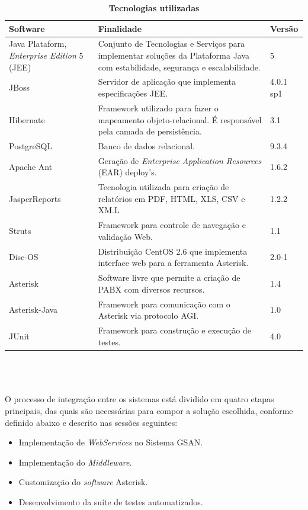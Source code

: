 \begin{table}[H]
	\footnotesize
	\caption{\textbf{Tecnologias utilizadas}}
	\label{tabela:tecnologiasUtilizadas}
	\begin{tabular}{|p{4cm}|p{7cm}|p{2cm}|}
		\hline
		\textbf{Software} & \textbf{Finalidade} & \textbf{Versão} \\
		\hline
		Java Plataform, \textit{Enterprise Edition} 5 (JEE) & Conjunto de Tecnologias e Serviços para implementar soluções da Plataforma Java com estabilidade, segurança e escalabilidade. & 5 \\
		\hline
		JBoss 				& Servidor de aplicação que implementa especificações JEE. 								& 4.0.1 sp1 \\
		\hline
		Hibernate 			& Framework utilizado para fazer o mapeamento objeto-relacional. É responsável pela camada de persistência. & 3.1 \\
		\hline
		PostgreSQL 			& Banco de dados relacional. 															& 9.3.4 \\
		\hline
		Apache Ant 			& Geração de \textit{Enterprise Application Resources} (EAR) deploy’s. 					& 1.6.2 \\
		\hline
		JasperReports 		& Tecnologia utilizada para criação de relatórios em PDF, HTML, XLS, CSV e XM.L 		& 1.2.2 \\
		\hline
		Struts 				& Framework para controle de navegação e validação Web. 								& 1.1	 \\
		\hline
		Disc-OS 			& Distribuição CentOS 2.6 que implementa interface web para a ferramenta Asterisk. 		& 2.0-1 \\
		\hline
		Asterisk 			& Software livre que permite a criação de PABX com diversos recursos. 					& 1.4 \\		
		\hline
		Asterisk-Java 		& Framework para comunicação com o Asterisk via protocolo AGI. 							& 1.0 \\
		\hline
		JUnit		 		& Framework para construção e execução de testes. 										& 4.0 \\		
		\hline			
	\end{tabular}\\[6pt]
	\fontsize{10}{12}\selectfont {Fonte: Autoria Própria.}
\end{table}



\section{\fontsize{12}{1} }
O processo de integração entre os sistemas está dividido em quatro etapas principais, das quais são necessárias para compor a solução escolhida, conforme definido abaixo e descrito nas sessões seguintes:

\begin{itemize}
	\item Implementação de \textit{WebServices} no Sistema GSAN. 
	\item Implementação do \textit{Middleware}.
	\item Customização do \textit{software} Asterisk.
	\item Desenvolvimento da suíte de testes automatizados.
\end{itemize}
